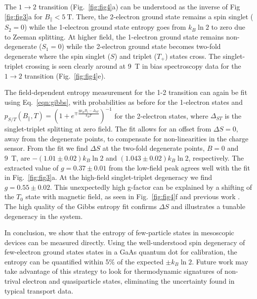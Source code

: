 \documentclass[twocolumn,showpacs,amsmath,amssymb,prl,aps,superscriptaddress]{revtex4-1}
\begin{document}
The $1\rightarrow 2$ transition (Fig.~\ref{fig:fig4}a) can be understood as the inverse of Fig \ref{fig:fig3}a for $B_\parallel < \SI{5}{\tesla}$.  There, the 2-electron ground state remains a spin singlet ($S_2=0$) while the 1-electron ground state entropy goes from $k_B\ln{2}$ to zero due to Zeeman splitting. At higher field, the 1-electron ground state remains non-degenerate ($S_1=0$) while the 2-electron ground state becomes two-fold degenerate where the spin singlet ($S$) and triplet ($T_+$) states cross. The singlet-triplet crossing is seen clearly around at \SI{9}{\tesla} in bias spectroscopy data for the $1\rightarrow 2$ transition (Fig.~\ref{fig:fig4}e). 

The field-dependent entropy measurement for the 1-2 transition can again be fit using Eq.~\ref{eqn:gibbs}, with probabilities as before for the 1-electron states and $p_{S/T}(B_\parallel, T) = (1+ e^{\mp \frac{g\mu_B B_\parallel - \Delta_{ST}}{k_B T}})^{-1}$ for the 2-electron states, where $\Delta_{ST}$ is the singlet-triplet splitting at zero field. The fit allows for an offset from $\Delta S=0$, away from the degenerate points, to compensate for non-linearities in the charge sensor. From the fit we find $\Delta S$ at the two-fold degenerate points, $B=0$ and \SI{9}{\tesla}, are $-(1.01\pm0.02) k_B \ln{2}$ and $(1.043 \pm 0.02) k_B \ln{2}$, respectively. The extracted value of $g = 0.37 \pm 0.01$ from the low-field peak agrees well with the fit in Fig.~\ref{fig:fig3}a. At the high-field singlet-triplet degeneracy we find $g = 0.55 \pm 0.02$. This unexpectedly high g-factor can be explained by a shifting of the $T_{0}$ state with magnetic field, as seen in Fig.~\ref{fig:fig4}f and previous work \cite{Szafran2004}. The high quality of the Gibbs entropy fit confirms $\Delta S$ and illustrates a tunable degeneracy in the system.

In conclusion, we show that the entropy of few-particle states in mesoscopic devices can be measured directly.  Using the well-understood spin degeneracy of  few-electron ground states states in a GaAs quantum dot for calibration, the entropy can be quantified within 5\% of the expected $\pm k_B\ln{2}$.  Future work may take advantage of this strategy to look for thermodynamic signatures of non-trival electron and quasiparticle states, eliminating the uncertainty found in typical transport data.
\end{document}

